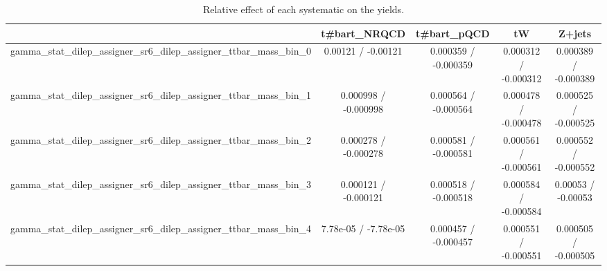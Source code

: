 \documentclass[10pt]{article}
\begin{document}
\begin{table}[htbp]
\begin{center}
\begin{tabular}{|c|c|c|c|c|}
\hline 
      & t#bar{t}_{NRQCD}      & t#bar{t}_{pQCD}      & tW      & Z+jets \\ 
\hline 
  gamma_stat_dilep_assigner_sr6_dilep_assigner_ttbar_mass_bin_0 & 0.00121 / -0.00121 & 0.000359 / -0.000359 & 0.000312 / -0.000312 & 0.000389 / -0.000389 \\ 
  gamma_stat_dilep_assigner_sr6_dilep_assigner_ttbar_mass_bin_1 & 0.000998 / -0.000998 & 0.000564 / -0.000564 & 0.000478 / -0.000478 & 0.000525 / -0.000525 \\ 
  gamma_stat_dilep_assigner_sr6_dilep_assigner_ttbar_mass_bin_2 & 0.000278 / -0.000278 & 0.000581 / -0.000581 & 0.000561 / -0.000561 & 0.000552 / -0.000552 \\ 
  gamma_stat_dilep_assigner_sr6_dilep_assigner_ttbar_mass_bin_3 & 0.000121 / -0.000121 & 0.000518 / -0.000518 & 0.000584 / -0.000584 & 0.00053 / -0.00053 \\ 
  gamma_stat_dilep_assigner_sr6_dilep_assigner_ttbar_mass_bin_4 & 7.78e-05 / -7.78e-05 & 0.000457 / -0.000457 & 0.000551 / -0.000551 & 0.000505 / -0.000505 \\ 
\hline 
\end{tabular} 
\caption{Relative effect of each systematic on the yields.} 
\end{center} 
\end{table} 
\end{document}
